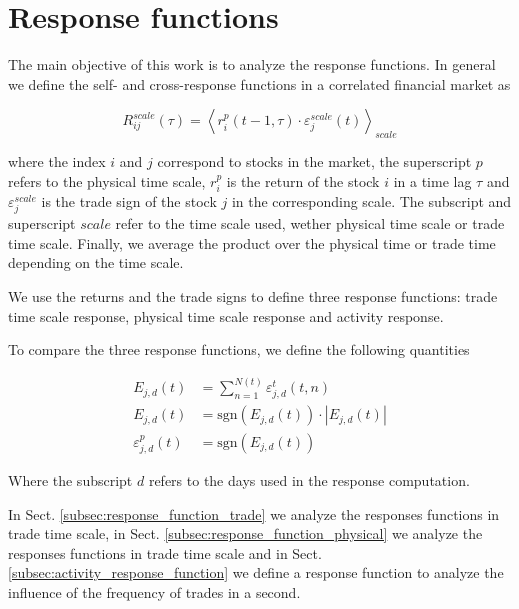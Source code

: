 \section{Response functions}\label{sec:response_functions}

The main objective of this work is to analyze the response functions. In
general we define the self- and cross-response functions in a correlated
financial market as

\begin{equation}\label{eq:response_general}
    R^{scale}_{ij}\left(\tau\right)=\left\langle r^{p}_{i}\left(t-1,
    \tau\right) \cdot\varepsilon^{scale}_{j} \left(t\right)\right\rangle
    _{scale}
\end{equation}

where the index $i$ and $j$ correspond to stocks in the market, the superscript
$p$ refers to the physical time scale,
$r^{p}_{i}$ is the return of the stock $i$ in a time lag $\tau$ and
$\varepsilon^{scale}_{j}$ is the trade sign of the stock $j$ in the
corresponding scale. The subscript and superscript $scale$ refer to the time
scale used, wether physical time scale or trade time scale. Finally, we average
the product over the physical time or trade time depending on the time scale.

We use the returns and the trade signs to define three response functions:
trade time scale response, physical time scale response and activity response.

To compare the three response functions, we define the following quantities

\begin{align}
    E_{j,d}\left(t\right)&=\sum_{n=1}^{N\left(t\right)}
    \varepsilon_{j,d}^{t}\left(t,n\right)\\
    E_{j,d}\left(t\right)&=\text{sgn}\left(E_{j,d}\left(t\right)\right)
    \cdot\left|E_{j,d}\left(t\right)\right|\\
    \varepsilon_{j,d}^{p}\left(t\right)&=
    \text{sgn}\left(E_{j,d}\left(t\right)\right)
\end{align}

Where the subscript $d$ refers to the days used in the response computation.

In Sect. \ref{subsec:response_function_trade} we analyze the responses
functions in trade time scale, in Sect. \ref{subsec:response_function_physical}
we analyze the responses functions in trade time scale and in Sect.
\ref{subsec:activity_response_function} we define a response function to
analyze the influence of the frequency of trades in a second.

